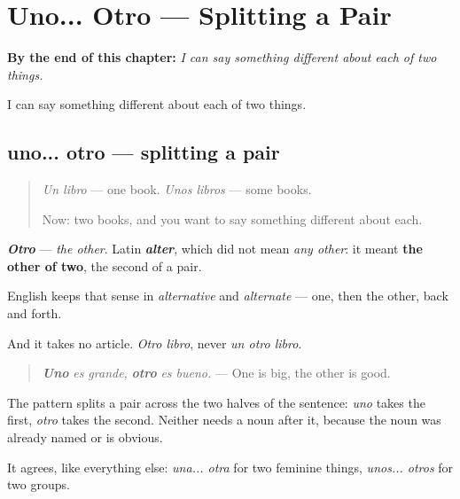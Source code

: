 
\chapter{Uno... Otro --- Splitting a Pair}
\label{ch:uno-otro}

\begin{chapteropening}
\textbf{By the end of this chapter:} \emph{I can say something different about each of two things.}

I can say something different about each of two things.
\end{chapteropening}

\section[uno... otro]{uno... otro — splitting a pair}

\label{lesson:ES-C67-uno-otro}



\begin{quote}
\emph{Un libro} — one book. \emph{Unos libros} — some books.

Now: two books, and you want to say something different about each.
\end{quote}

\begin{cousinweb}
\emph{\textbf{Otro}} — \emph{the other}. Latin \emph{\textbf{alter}}, which did not mean \emph{any other}: it meant \textbf{the other of two}, the second of a pair.

English keeps that sense in \emph{alternative} and \emph{alternate} — one, then the other, back and forth.

And it takes no article. \emph{Otro libro}, never \emph{un otro libro}.
\end{cousinweb}

\begin{grammarlens}[title={Grammar Lens: one at each end}]
\begin{quote}
\emph{\textbf{Uno}} \emph{es grande,} \emph{\textbf{otro}} \emph{es bueno.} — One is big, the other is good.
\end{quote}

The pattern splits a pair across the two halves of the sentence: \emph{uno} takes the first, \emph{otro} takes the second. Neither needs a noun after it, because the noun was already named or is obvious.

It agrees, like everything else: \emph{una... otra} for two feminine things, \emph{unos... otros} for two groups.
\end{grammarlens}

